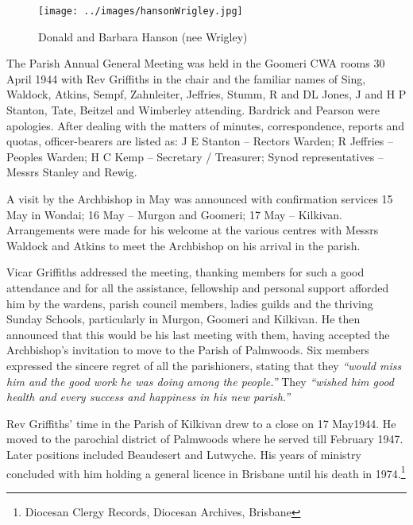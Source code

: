 \begin{figure}
\begin{center}
\texttt{[image: ../images/hansonWrigley.jpg]}
\caption{Donald and Barbara Hanson (nee Wrigley)}
\end{center}
\end{figure}




The Parish Annual General Meeting was held in the Goomeri CWA rooms 30 April 1944 with Rev Griffiths in the chair and the familiar names of Sing, Waldock, Atkins, Sempf, Zahnleiter, Jeffries, Stumm, R and DL Jones, J and H P Stanton, Tate, Beitzel and Wimberley attending. Bardrick and Pearson were apologies. After dealing with the matters of minutes, correspondence, reports and quotas, officer-bearers are listed as: J E Stanton -- Rectors Warden; R Jeffries -- Peoples Warden; H C Kemp -- Secretary / Treasurer; Synod representatives -- Messrs Stanley and Rewig.



A visit by the Archbishop in May was announced with confirmation services 15 May in Wondai; 16 May -- Murgon and Goomeri; 17 May -- Kilkivan. Arrangements were made for his welcome at the various centres with Messrs Waldock and Atkins to meet the Archbishop on his arrival in the parish.



Vicar Griffiths addressed the meeting, thanking members for such a good attendance and for all the assistance, fellowship and personal support afforded him by the wardens, parish council members, ladies guilds and the thriving Sunday Schools, particularly in Murgon, Goomeri and Kilkivan. He then announced that this would be his last meeting with them, having accepted the Archbishop's invitation to move to the Parish of Palmwoods. Six members expressed the sincere regret of all the parishioners, stating that they \emph{``would miss him and the good work he was doing among the people.''} They \emph{``wished him good health and every success and happiness in his new parish.''}



Rev Griffiths' time in the Parish of Kilkivan drew to a close on 17 May1944. He moved to the parochial district of Palmwoods where he served till February 1947. Later positions included Beaudesert and Lutwyche. His years of ministry concluded with him holding a general licence in Brisbane until his death in 1974.\footnote{Diocesan Clergy Records, Diocesan Archives, Brisbane}


